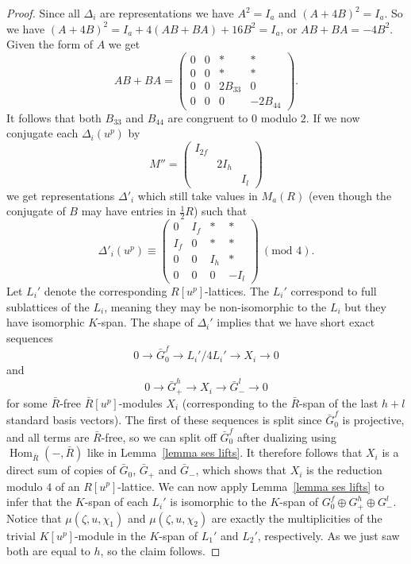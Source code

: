 \documentclass[11pt, a4paper]{amsart}
\theoremstyle{definition}
\theoremstyle{definition}
\newcommand{\Hom}{\operatorname{Hom}}
\begin{document}
\begin{proof}
    Since all $\Delta_i$ are representations we have $A^2=I_a$ and $(A+4B)^2=I_a$. So we have $(A+4B)^2=I_a+4(AB+BA)+16B^2=I_a$, or $AB+BA=-4B^2$. Given the form of $A$ we get 
    \begin{equation}
        AB+BA = \left(\begin{array}{cccc}  0&0&*&*\\ 0&0&*&* \\ 0&0&2B_{33} &0\\0&0&0&-2B_{44} \end{array}\right).
    \end{equation} 
    It follows that both $B_{33}$ and $B_{44}$ are congruent to $0$ modulo $2$. If we now conjugate each $\Delta_i(u^p)$ by 
    \begin{equation}
        M''= \left(\begin{array}{ccc} I_{2f} \\ & 2I_h \\ &&I_l\end{array}\right)
    \end{equation} 
    we get representations $\Delta'_i$ which still take values in $M_a(R)$ (even though the conjugate of $B$ may have entries in $\frac{1}{2}R$) such that 
    \begin{equation}
        \Delta'_i(u^p)\equiv\left(\begin{array}{cccc} 0&I_f&*&* \\ I_f&0&*&*\\0&0&I_h&* \\0&0&0&-I_l \end{array}\right) \ (\textrm{mod }4).
    \end{equation}
    Let $L_i'$ denote the corresponding $R[u^p]$-lattices. The $L_i'$ correspond to full sublattices of the $L_i$, meaning they may be non-isomorphic to the $L_i$ but they have isomorphic $K$-span. The shape of $\Delta_i'$ implies that we have short exact sequences
    \begin{equation}
        0\longrightarrow \bar G_0^f  \longrightarrow L_i'/4L_i' \longrightarrow X_i \longrightarrow 0
    \end{equation}
    and 
    \begin{equation}
        0 \longrightarrow \bar G_+^h \longrightarrow X_i \longrightarrow \bar G_-^l\longrightarrow 0
    \end{equation}
    for some $\bar R$-free $\bar R[u^p]$-modules $X_i$ (corresponding to the $\bar R$-span of the last $h+l$ standard basis vectors). The first of these sequences is split since $\bar G_0^f$ is projective, and all terms are $\bar R$-free, so we can split off $\bar G_0^f$ after dualizing using $\Hom_{\bar R}(-,\bar R)$ like in Lemma~\ref{lemma ses lifts}. It therefore follows that $X_i$ is a direct sum of copies of $\bar G_0$, $\bar G_+$ and $\bar G_-$, which shows that $X_i$ is the reduction modulo $4$ of an $R[u^p]$-lattice. We can now apply Lemma~\ref{lemma ses lifts} to infer that the $K$-span of each $L_i'$ is isomorphic to the $K$-span of $G_0^f\oplus G_+^h\oplus G_-^l$. Notice that $\mu(\zeta, u, \chi_1)$ and $\mu(\zeta, u, \chi_2)$ are exactly the multiplicities of the trivial $K[u^p]$-module in the $K$-span of $L_1'$ and $L_2'$, respectively. As we just saw both are equal to $h$, so the claim follows.

\end{proof}
\end{document}
